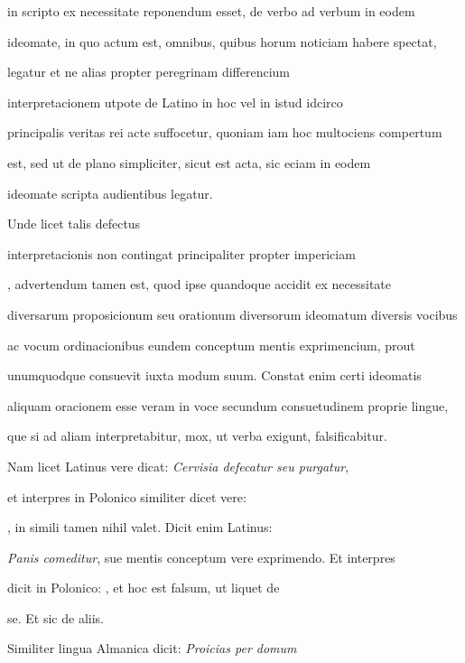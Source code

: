 in scripto ex necessitate reponendum esset, de verbo ad verbum in eodem

ideomate, in quo actum est, omnibus, quibus horum noticiam habere spectat,

 legatur et ne alias propter peregrinam differencium 

 interpretacionem utpote de Latino in hoc vel in istud idcirco

principalis veritas rei acte suffocetur, quoniam iam hoc multociens compertum

est, sed ut de plano simpliciter, sicut est acta, sic eciam in eodem

\splitlines{}

ideomate scripta audientibus legatur.

\indentK Unde licet talis defectus

\fulllines{}

interpretacionis non contingat principaliter propter impericiam 

, advertendum tamen est, quod ipse quandoque accidit ex necessitate

diversarum proposicionum seu orationum diversorum ideomatum diversis vocibus

ac vocum ordinacionibus eundem conceptum mentis exprimencium, prout

unumquodque consuevit iuxta modum suum. Constat enim certi ideomatis

aliquam oracionem esse veram in voce secundum consuetudinem proprie lingue,

que si ad aliam interpretabitur, mox, ut verba exigunt, falsificabitur.

\indentK Nam licet Latinus vere dicat: \textit{Cervisia defecatur seu purgatur},

et interpres in Polonico similiter dicet vere:   

   , in simili tamen nihil valet. Dicit enim Latinus:

\textit{Panis comeditur}, sue mentis conceptum vere exprimendo. Et interpres

dicit in Polonico:   , et hoc est falsum, ut liquet de

\splitlines{}

se. Et sic de aliis.

\indentK Similiter lingua Almanica dicit: \textit{Proicias per domum}


